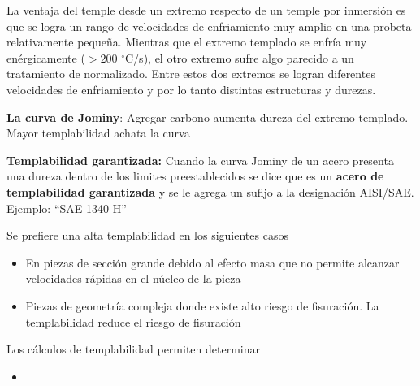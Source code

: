 \documentclass{article}
\newcommand{\grad}{\ensuremath{^\circ \mathrm{C}}}
\begin{document}
La ventaja del temple desde un extremo respecto de un temple por inmersión es que se logra un rango de velocidades de enfriamiento muy amplio en una probeta relativamente pequeña. Mientras que el extremo templado se enfría muy enérgicamente ($>200$ \grad/s), el otro extremo sufre algo parecido a un tratamiento de normalizado. Entre estos dos extremos se logran diferentes velocidades de enfriamiento y por lo tanto distintas estructuras y durezas.

\textbf{La curva de Jominy}: Agregar carbono aumenta dureza del extremo templado. Mayor templabilidad achata la curva

\textbf{Templabilidad garantizada:} Cuando la curva Jominy de un acero presenta una dureza dentro de los limites preestablecidos se dice que es un \textbf{acero de templabilidad garantizada} y se le agrega un sufijo a la designación AISI/SAE. Ejemplo: ``SAE 1340 H'' 


Se prefiere una alta templabilidad en los siguientes casos
\begin{itemize}
    \item En piezas de sección grande debido al efecto masa que no permite alcanzar velocidades rápidas en el núcleo de la pieza
    \item Piezas de geometría compleja donde existe alto riesgo de fisuraci\'on. La templabilidad reduce el riesgo de fisuración
\end{itemize}

Los cálculos de templabilidad permiten determinar 

\begin{itemize}
    \item 
\end{itemize}
\end{document}
